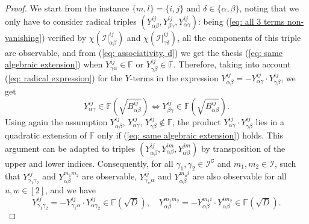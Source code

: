 \documentclass[10pt]{article}
\theoremstyle{remark}%
\theoremstyle{definition}%
\begin{document}
\begin{proof}
We start from the instance $\{m,l\}=\{i,j\}$ and $\delta\in\{\alpha,\beta\}$, noting that we only have to consider radical triples $(Y_{\alpha\beta}^{ij},Y_{\beta\gamma}^{ij},Y_{\alpha\gamma}^{ij})$: being (\ref{eq: all 3 terms non-vanishing}) verified by $\chi(\mathcal{I}|_{\alpha\beta}^{ij})$ and $\chi(\mathcal{I}|_{\gamma\delta}^{ij})$, all the components of this triple are observable, and from (\ref{eq: associativity, d}) we get the thesis (\ref{eq: same algebraic extension}) when $Y_{\gamma\alpha}^{ij}\in\mathbb{F}$ or $Y_{\gamma\beta}^{ij}\in\mathbb{F}$. Therefore, taking into account (\ref{eq: radical expression}) for 
the $Y$-terms in the expression $Y_{\alpha\beta}^{ij}=-Y_{\alpha\gamma}^{ij}\cdot Y_{\gamma\beta}^{ij}$, we get  
 \begin{equation}
Y_{\alpha\gamma}^{ij}\in\mathbb{F}(\sqrt{B_{\alpha\beta}^{ij}})\Leftrightarrow Y_{\beta\gamma}^{ij}\in\mathbb{F}(\sqrt{B_{\alpha\beta}^{ij}}).
\label{eq: conditionals same extension}
 \end{equation}
Using again the assumption $Y_{\alpha\beta}^{ij}$, $Y_{\alpha\gamma}^{ij}$, $Y_{\gamma\beta}^{ij}\notin\mathbb{F}$, the product $Y_{\alpha\gamma}^{ij}\cdot Y_{\gamma\beta}^{ij}$ lies in a quadratic extension of $\mathbb{F}$ only if (\ref{eq: same algebraic extension}) holds. 
This argument can be adapted to triples $(Y_{\alpha\beta}^{ij},Y_{\alpha\beta}^{im},Y_{\alpha\beta}^{jm})$ by transposition of the upper and lower indices. Consequently, for all $\gamma_{1},\gamma_{2}\in\mathcal{I}^{\mathtt{C}}$ and $m_{1},m_{2}\in\mathcal{I}$, such that $Y_{\gamma_{1}\gamma_{2}}^{ij}$ and $Y_{\alpha\beta}^{m_{1}m_{2}}$ are observable, $Y_{\gamma_{w}\alpha}^{ij}$ and $Y_{\alpha\beta}^{m_{u}i}$ are also observable for all $u,w\in[2]$, and we have 
\begin{equation}
    Y_{\gamma_{1}\gamma_{2}}^{ij}=-Y_{\gamma_{1}\alpha}^{ij}\cdot Y_{\alpha\gamma_{2}}^{ij}\in \mathbb{F}(\sqrt{D}),\quad  Y_{\alpha\beta}^{m_{1}m_{2}}=-Y_{\alpha\beta}^{m_{1}i}\cdot Y_{\alpha\beta}^{im_{2}}\in \mathbb{F}(\sqrt{D}).
\label{eq: same quadratic extension, only upper or lower}
\end{equation}


\end{proof}
\end{document}

